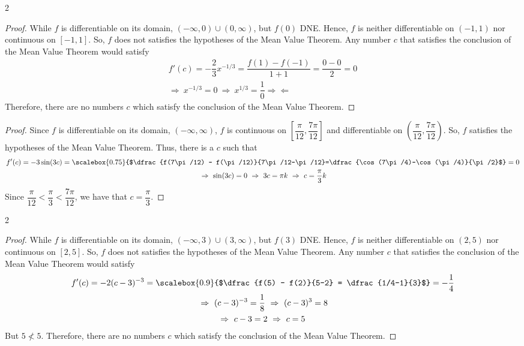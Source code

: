 \documentclass{book}
\begin{document}
\begin{appendices}
\begin{enumerate}[!HW!]
\begin{multicols}{2}
\begin{proof}
While $f$ is differentiable on its domain, $(-\infty, 0)\cup (0,\infty)$, but $f(0)$ DNE. Hence, $f$ is neither differentiable on $(-1,1)$ nor continuous on $[-1,1]$. So, $f$ does not satisfies the hypotheses of the Mean Value Theorem. Any number $c$ that satisfies the conclusion of the Mean Value Theorem would satisfy
\begin{multline*}
f'(c) = -\dfrac{2}{3}x^{-1/3}= \dfrac{f(1) - f(-1)}{1+1}=\dfrac{0-0}{2} = 0\\
\Rightarrow\ x^{-1/3} = 0 \ \Rightarrow\ x^{1/3} = \dfrac{1}{0} \Rightarrow\Leftarrow
\end{multline*} Therefore, there are no numbers $c$ which satisfy the conclusion of the Mean Value Theorem.
\end{proof}\columnbreak

\itemspade \mbox{}\vspace{-25pt}

\begin{proof}
Since $f$ is differentiable on its domain, $(-\infty, \infty)$, $f$ is continuous on $\left[\dfrac{\pi}{12},\dfrac{7\pi}{12}\right]$ and differentiable on $\left(\dfrac{\pi}{12},\dfrac{7\pi}{12}\right)$. So, $f$ satisfies the hypotheses of the Mean Value Theorem. Thus, there is a $c$ such that 
\begin{multline*}
f'(c)=-3\sin(3c) = \scalebox{0.75}{$\dfrac{f(7\pi/12) - f(\pi/12)}{7\pi/12-\pi/12}=\dfrac{\cos(7\pi/4)-\cos(\pi/4)}{\pi/2}$} = 0\\
\ \Rightarrow\ \sin(3c) = 0 \ \Rightarrow\ 3c = \pi k \ \Rightarrow\ c= \dfrac{\pi}{3}k
\end{multline*} Since $ \dfrac{\pi}{12} < \dfrac{\pi}{3} <  \dfrac{7\pi}{12}$, we have that $c=  \dfrac{\pi}{3}$.
\end{proof}
\end{multicols}
\begin{multicols}{2}
\itemspade \mbox{}\vspace{-25pt}

\begin{proof}
While $f$ is differentiable on its domain, $(-\infty, 3)\cup (3,\infty)$, but $f(3)$ DNE. Hence, $f$ is neither differentiable on $(2,5)$ nor continuous on $[2,5]$. So, $f$ does not satisfies the hypotheses of the Mean Value Theorem. Any number $c$ that satisfies the conclusion of the Mean Value Theorem would satisfy
\begin{multline*}
f'(c)=-2(c-3)^{-3} =\scalebox{0.9}{$\dfrac{f(5) - f(2)}{5-2} = \dfrac{1/4-1}{3}$} = -\dfrac{1}{4}\\
\ \Rightarrow\ (c-3)^{-3} = \dfrac{1}{8} \ \Rightarrow\ (c-3)^3=8 \\ \Rightarrow\ c-3 = 2 \ \Rightarrow\ c = 5
\end{multline*} But $5\not< 5$. Therefore, there are no numbers $c$ which satisfy the conclusion of the Mean Value Theorem.
\end{proof}\columnbreak


\end{multicols}
\end{enumerate}
\end{appendices}
\end{document}
